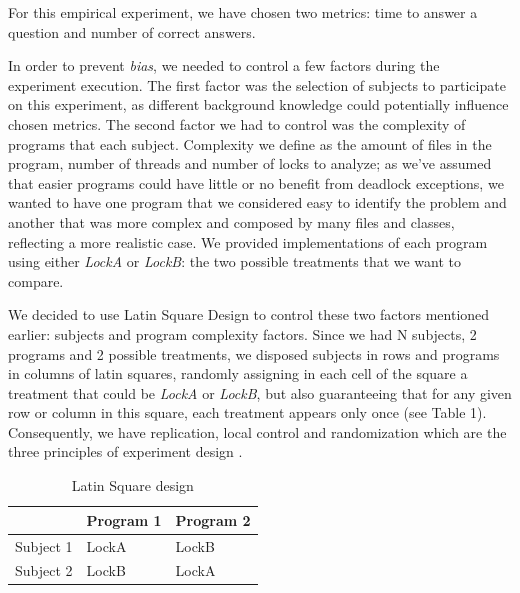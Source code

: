 For this empirical experiment, we have chosen two metrics: time to answer a question and number of correct answers.

In order to prevent \emph{bias}, we needed to control a few factors during the experiment execution. The first factor was the selection of subjects to participate on this experiment, as different background knowledge could potentially influence chosen metrics. The second factor we had to control was the complexity of programs that each subject. Complexity we define as the amount of files in the program, number of threads and number of locks to analyze; as we've assumed that easier programs could have little or no benefit from deadlock exceptions, we wanted to have one program that we considered easy to identify the problem and another that was more complex and composed by many files and classes, reflecting a more realistic case. We provided implementations of each program using either \emph{LockA} or \emph{LockB}: the two possible treatments that we want to compare.

We decided to use Latin Square Design to control these two factors mentioned earlier: subjects and program complexity factors. Since we had N subjects, 2 programs and 2 possible treatments, we disposed subjects in rows and programs in columns of latin squares, randomly assigning in each cell of the square a treatment that could be \emph{LockA} or \emph{LockB}, but also guaranteeing that for any given row or column in this square, each treatment appears only once (see Table 1). Consequently, we have replication, local control and randomization which are the three principles of experiment design \cite{box}.

\begin{table}
\begin{center}
\caption{Latin Square design}
\begin{tabular}{|l|l|l|}
\hline
 & Program 1 & Program 2\\
\hline
Subject 1 & LockA & LockB\\
Subject 2 & LockB & LockA\\
\hline
\end{tabular}
\end{center}
\end{table}

